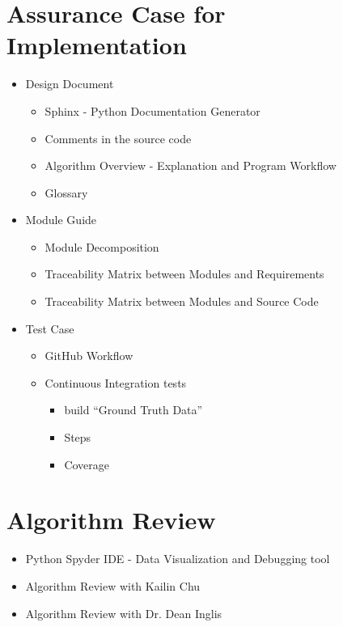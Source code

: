 \section{Assurance Case for Implementation}
\begin{itemize}
\item Design Document
\begin{itemize}
\item Sphinx - Python Documentation Generator
\item Comments in the source code
\item Algorithm Overview - Explanation and Program Workflow
\item Glossary
\end{itemize}
\item Module Guide
\begin{itemize}
\item Module Decomposition
\item Traceability Matrix between Modules and Requirements
\item Traceability Matrix between Modules and Source Code
\end{itemize}

\item Test Case
\begin{itemize}
\item GitHub Workflow
\item Continuous Integration tests
\begin{itemize}
\item build ``Ground Truth Data''
\item Steps
\item Coverage
\end{itemize}
\end{itemize}

\end{itemize}

\section{Algorithm Review}
\begin{itemize}
\item Python Spyder IDE - Data Visualization and Debugging tool
\item Algorithm Review with Kailin Chu
\item Algorithm Review with Dr. Dean Inglis
\end{itemize}


